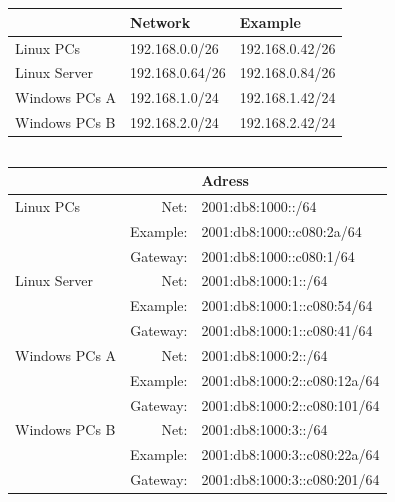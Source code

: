 \documentclass{article}
\begin{document}
    
    
    \section{}
    \subsection{}

    \begin{table}[H]
    \centering
        \begin{tabular}{l l l}
            \textbf{} & \textbf{Network} & \textbf{Example} \\
            \hline
            Linux PCs      & 192.168.0.0/26  & 192.168.0.42/26 \\
            Linux Server   & 192.168.0.64/26 & 192.168.0.84/26 \\
            Windows PCs A  & 192.168.1.0/24  & 192.168.1.42/24 \\
            Windows PCs B  & 192.168.2.0/24  & 192.168.2.42/24 \\
        \end{tabular}
    \end{table}
    
    \subsection{}

    \begin{table}[H]
    \centering
    \begin{tabular}{l r l}
    \textbf{} & \textbf{} & \textbf{Adress} \\
    \hline
    Linux PCs      & Net: & 2001:db8:1000::/64 \\
                   & Example: & 2001:db8:1000::c080:2a/64 \\
                   & Gateway:  & 2001:db8:1000::c080:1/64 \\
    \hline
    Linux Server   & Net: & 2001:db8:1000:1::/64 \\
                   & Example: & 2001:db8:1000:1::c080:54/64 \\
                   & Gateway:  & 2001:db8:1000:1::c080:41/64 \\
    \hline
    Windows PCs A  & Net: & 2001:db8:1000:2::/64 \\
                   & Example: & 2001:db8:1000:2::c080:12a/64 \\
                   & Gateway:  & 2001:db8:1000:2::c080:101/64 \\
    \hline
    Windows PCs B  & Net: & 2001:db8:1000:3::/64 \\
                   & Example: & 2001:db8:1000:3::c080:22a/64 \\
                   & Gateway:  & 2001:db8:1000:3::c080:201/64 \\
    \end{tabular}
    \end{table}
    
\end{document}

